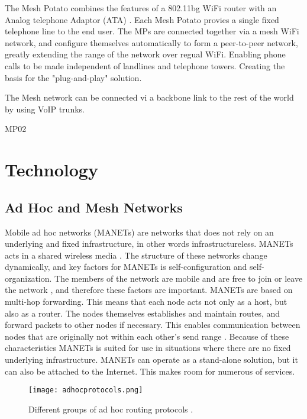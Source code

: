 The Mesh Potato combines the features of a 802.11bg WiFi router with an Analog telephone Adaptor (ATA) \cite{MP}. Each Mesh Potato provies a single fixed telephone line to the end user. The MPs are connected together via a mesh WiFi network, and  configure themselves automatically to form a peer-to-peer network, greatly extending the range of the network over regual WiFi. Enabling phone calls to be made independent of landlines and telephone towers. Creating the basis for the "plug-and-play" solution. 








The Mesh network can be connected vi a backbone link to the rest of the world by using VoIP trunks. 


MP02





\section{Technology}

\subsection{Ad Hoc and Mesh Networks}
Mobile ad hoc networks (MANETs) are networks that does not rely on an underlying and fixed infrastructure, in other words infrastructureless. MANETs acts in a shared wireless media \cite{adhoc}. The structure of these networks change dynamically, and key factors for MANETs is self-configuration and self-organization. The members of the network are mobile and are free to join or leave the network \cite{adhoc2}, and therefore these factors are important. MANETs are based on multi-hop forwarding. This means that each node acts not only as a host, but also as a router. The nodes themselves establishes and maintain routes, and forward packets to other nodes if necessary. This enables communication between nodes that are originally not within each other's send range \cite{adhoc2}. Because of these characteristics MANETs is suited for use in situations where there are no fixed underlying infrastructure. MANETs can operate as a stand-alone solution, but it can also be attached to the Internet. This makes room for numerous of services. 

\begin{figure}[h!]
  \centering
    \texttt{[image: adhocprotocols.png]}
     \caption{Different groups of ad hoc routing protocols \cite{adhoc}.}
\label{fig:adhoc}
\end{figure}

